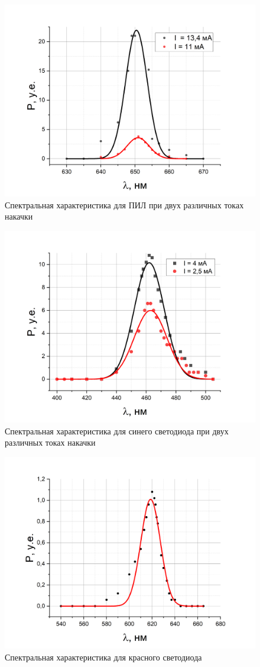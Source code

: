 \documentclass[a4paper,12pt]{article}
\begin{document}
\begin{figure}[h!]
	\centering
	\includegraphics[width = 0.7\linewidth]{laser_1_and_2}
	\caption{Спектральная характеристика для ПИЛ при двух различных токах накачки}
\end{figure}

\newpage

\begin{figure}[h!]
	\centering
	\includegraphics[width = 0.8\linewidth]{blue_1_and_2}
	\caption{Спектральная характеристика для синего светодиода при двух различных токах накачки}
\end{figure}

\begin{figure}[h!]
	\centering
	\includegraphics[width = 0.8\linewidth]{red}
	\caption{Спектральная характеристика для красного светодиода}
\end{figure}
\end{document}
